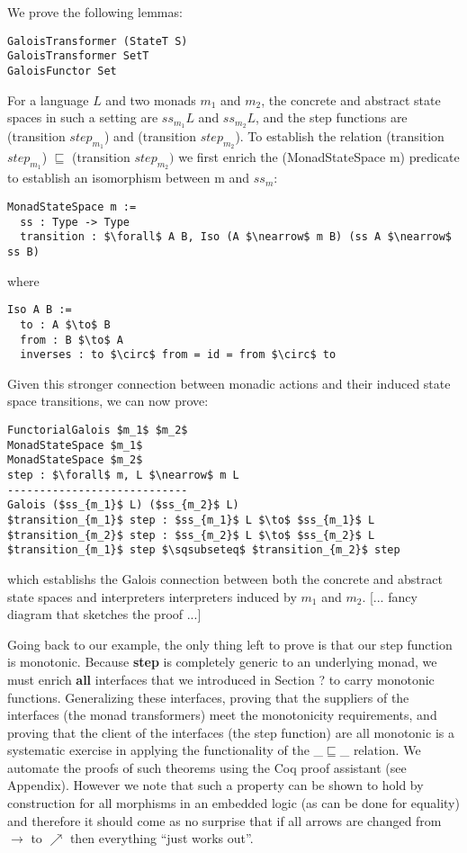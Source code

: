 We prove the following lemmas:
\begin{lstlisting}
GaloisTransformer (StateT S)
GaloisTransformer SetT
GaloisFunctor Set
\end{lstlisting}

For a language $L$ and two monads $m_1$ and $m_2$, the concrete and abstract
state spaces in such a setting are $ss_{m_1} L$ and $ss_{m_2} L$, and the step
functions are (transition $step_{m_1}$) and (transition $step_{m_2}$). To
establish the relation (transition $step_{m_1}$) $\sqsubseteq$ (transition
$step_{m_2})$ we first enrich the (MonadStateSpace m) predicate to establish
an isomorphism between m and $ss_m$:
\begin{lstlisting}
MonadStateSpace m :=
  ss : Type -> Type
  transition : $\forall$ A B, Iso (A $\nearrow$ m B) (ss A $\nearrow$ ss B)
\end{lstlisting}
where
\begin{lstlisting}
Iso A B :=
  to : A $\to$ B
  from : B $\to$ A
  inverses : to $\circ$ from = id = from $\circ$ to
\end{lstlisting}

Given this stronger connection between monadic actions and their induced
state space transitions, we can now prove:
\begin{lstlisting}
FunctorialGalois $m_1$ $m_2$
MonadStateSpace $m_1$
MonadStateSpace $m_2$
step : $\forall$ m, L $\nearrow$ m L
----------------------------
Galois ($ss_{m_1}$ L) ($ss_{m_2}$ L)
$transition_{m_1}$ step : $ss_{m_1}$ L $\to$ $ss_{m_1}$ L
$transition_{m_2}$ step : $ss_{m_2}$ L $\to$ $ss_{m_2}$ L
$transition_{m_1}$ step $\sqsubseteq$ $transition_{m_2}$ step
\end{lstlisting}
which establishs the Galois connection between both the concrete and abstract
state spaces and interpreters interpreters induced by $m_1$ and $m_2$.
%
[... fancy diagram that sketches the proof ...]

Going back to our example, the only thing left to prove is that our step
function is monotonic.
%
Because \textbf{step} is completely generic to an underlying monad, we must
enrich \textbf{all} interfaces that we introduced in Section ? to carry
monotonic functions.
%
Generalizing these interfaces, proving that the suppliers of the interfaces
(the monad transformers) meet the monotonicity requirements, and proving that
the client of the interfaces (the step function) are all monotonic is a
systematic exercise in applying the functionality of the \_$\sqsubseteq$\_
relation.
%
We automate the proofs of such theorems using the Coq proof assistant (see
Appendix).
%
However we note that such a property can be shown to hold by construction for
all morphisms in an embedded logic (as can be done for equality) and therefore
it should come as no surprise that if all arrows are changed from $\to$ to
$\nearrow$ then everything ``just works out''.


